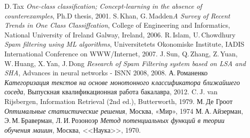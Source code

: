 \begin{thebibliography}{99}

 D.\,Tax  \textit{One-class classification; Concept-learning in the absence of
counterexamples}, Ph.D thesis, 2001.
 S.\,Khan, G.\,Madden\textit{A Survey of Recent Trends in One Class
Classiffcation}, College of Engineering and Informatics, National University of Ireland Galway,
Ireland, 2006.
 R.\,Islam, U.\,Chowdhury \textit{Spam filtering using ML algorithms}, Universitetets Okonomiske Institute, IADIS International Conference on WWW/Internet, 2007.
 J.\,Sun, Q.\,Zhang, Z.\,Yuan, W.\,Huang, X.\,Yan, J.\,Dong \textit{Research of Spam Filtering system based on LSA and SHA}, Advances in neural networks - ISNN 2008, 2008.
 А.\,Романенко  \textit{Категоризация текстов на основе монотонного
классификатора ближайшего соседа}, Выпускная квалификационная работа бакалавра, 2012.
 C.\,J. van Rijsbergen, Information Retrieval (2nd ed.), Butterworth, 1979.
М.\,Де Гроот \textit{Оптимальные статистические решения}, Москва, «Мир», 1974
 М.\,А.\,Айзерман, Э.\,М.\,Браверман, Л.\,И.\,Розоноэр \textit{Метод потенциальных функций в теории обучения машин}, Москва, <<Наука>>, 1970.

\end{thebibliography}